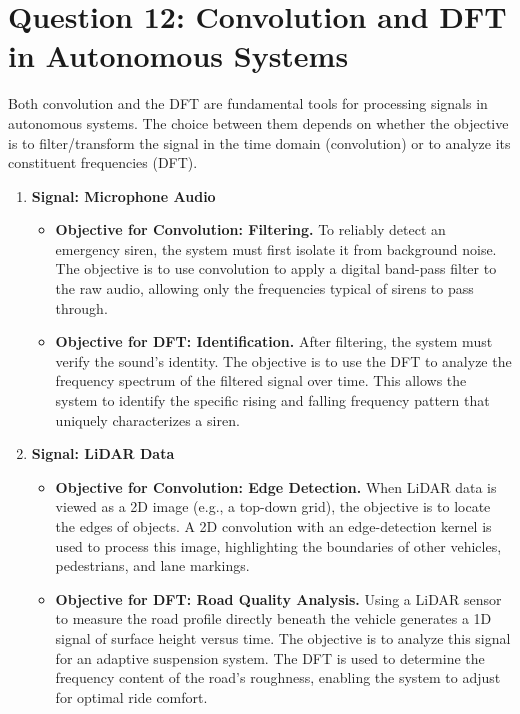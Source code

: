 \documentclass[a4paper,12pt]{article}
\begin{document}
\section{Question 12: Convolution and DFT in Autonomous Systems}
Both convolution and the DFT are fundamental tools for processing signals in autonomous systems. The choice between them depends on whether the objective is to filter/transform the signal in the time domain (convolution) or to analyze its constituent frequencies (DFT).

\begin{enumerate}
    \item \textbf{Signal: Microphone Audio}
    \begin{itemize}
        \item \textbf{Objective for Convolution: Filtering.} To reliably detect an emergency siren, the system must first isolate it from background noise. The objective is to use convolution to apply a digital band-pass filter to the raw audio, allowing only the frequencies typical of sirens to pass through.
        \item \textbf{Objective for DFT: Identification.} After filtering, the system must verify the sound's identity. The objective is to use the DFT to analyze the frequency spectrum of the filtered signal over time. This allows the system to identify the specific rising and falling frequency pattern that uniquely characterizes a siren.
    \end{itemize}
    
    \item \textbf{Signal: LiDAR Data}
    \begin{itemize}
        \item \textbf{Objective for Convolution: Edge Detection.} When LiDAR data is viewed as a 2D image (e.g., a top-down grid), the objective is to locate the edges of objects. A 2D convolution with an edge-detection kernel is used to process this image, highlighting the boundaries of other vehicles, pedestrians, and lane markings.
        \item \textbf{Objective for DFT: Road Quality Analysis.} Using a LiDAR sensor to measure the road profile directly beneath the vehicle generates a 1D signal of surface height versus time. The objective is to analyze this signal for an adaptive suspension system. The DFT is used to determine the frequency content of the road's roughness, enabling the system to adjust for optimal ride comfort.
    \end{itemize}
\end{enumerate}
\end{document}
